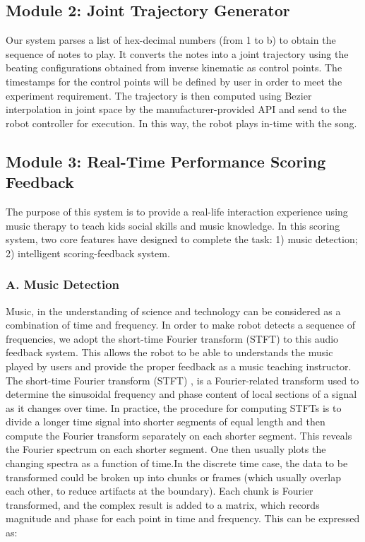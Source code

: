 \subsection{Module 2: Joint Trajectory Generator}
Our system parses a list of hex-decimal numbers (from 1 to b) to obtain the sequence
of notes to play. It converts the notes into a joint trajectory using the beating
configurations obtained from inverse kinematic as control points. The timestamps
for the control points will be defined by user in order to meet the experiment requirement.
The trajectory is then computed using Bezier interpolation in joint space by the
manufacturer-provided API and send to the robot controller for execution. In this
way, the robot plays in-time with the song.\\

\subsection{Module 3: Real-Time Performance Scoring Feedback}
The purpose of this system is to provide a real-life interaction experience using 
music therapy to teach kids social skills and music knowledge.  In this scoring 
system, two core features have designed to complete the task: 1) music detection;
2) intelligent scoring-feedback system.\\


\subsubsection{A. Music Detection}
Music, in the understanding of science and technology can be considered as a combination 
of time and frequency. In order to make robot detects a sequence of frequencies, we adopt the 
short-time Fourier transform (STFT) to this audio feedback system. This allows the robot to 
be able to understands the music played by users and provide the proper feedback as
a music teaching instructor.\\

The short-time Fourier transform (STFT) , is a Fourier-related transform used to 
determine the sinusoidal frequency and phase content of local sections of a signal 
as it changes over time. In practice, the procedure for computing STFTs is to divide 
a longer time signal into shorter segments of equal length and then compute the 
Fourier transform separately on each shorter segment. This reveals the Fourier 
spectrum on each shorter segment. One then usually plots the changing spectra as 
a function of time.In the discrete time case, the data to be transformed could 
be broken up into chunks or frames (which usually overlap each other, to reduce 
artifacts at the boundary). Each chunk is Fourier transformed, and the complex 
result is added to a matrix, which records magnitude and phase for each point in 
time and frequency. This can be expressed as:
\\

